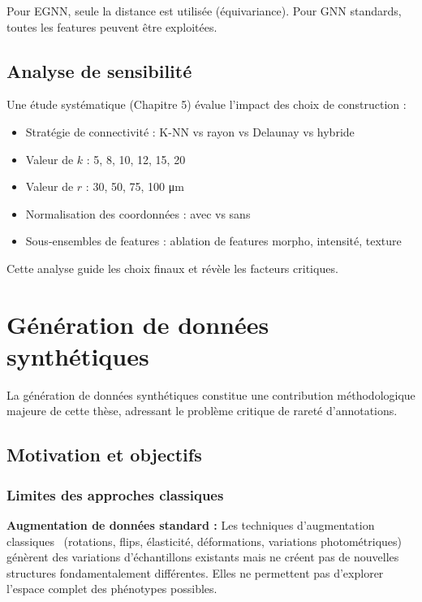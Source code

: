 Pour EGNN, seule la distance est utilisée (équivariance). Pour GNN standards, toutes les features peuvent être exploitées.

\subsection{Analyse de sensibilité}

Une étude systématique (Chapitre 5) évalue l'impact des choix de construction :
\begin{itemize}
    \item Stratégie de connectivité : K-NN vs rayon vs Delaunay vs hybride
    \item Valeur de $k$ : {5, 8, 10, 12, 15, 20}
    \item Valeur de $r$ : {30, 50, 75, 100} μm
    \item Normalisation des coordonnées : avec vs sans
    \item Sous-ensembles de features : ablation de features morpho, intensité, texture
\end{itemize}

Cette analyse guide les choix finaux et révèle les facteurs critiques.

\section{Génération de données synthétiques}

La génération de données synthétiques constitue une contribution méthodologique majeure de cette thèse, adressant le problème critique de rareté d'annotations.

\subsection{Motivation et objectifs}

\subsubsection{Limites des approches classiques}

\textbf{Augmentation de données standard :}
Les techniques d'augmentation classiques~\cite{Shorten2019} (rotations, flips, élasticité, déformations, variations photométriques) génèrent des variations d'échantillons existants mais ne créent pas de nouvelles structures fondamentalement différentes. Elles ne permettent pas d'explorer l'espace complet des phénotypes possibles.

